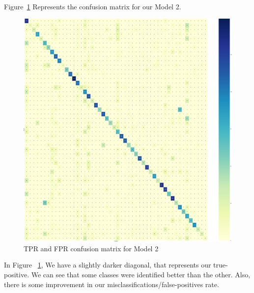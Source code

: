 \documentclass[conference]{IEEEtran}
\begin{document}
\FloatBarrier
Figure~\ref{fig:CM_50}  Represents the confusion matrix for our Model 2.
\begin{figure}[!htbp]
\centerline
{\includegraphics[width=\columnwidth]{images/Conf_50-cropped.pdf}}
\caption{TPR and FPR confusion matrix for Model 2}
\label{fig:CM_50}
\end{figure}
In Figure ~\ref{fig:CM_50}, We have a slightly darker diagonal, that represents our true-positive. We can see that some classes were identified better than the other. Also, there is some improvement in our misclassifications/false-positives rate. 
\end{document}

